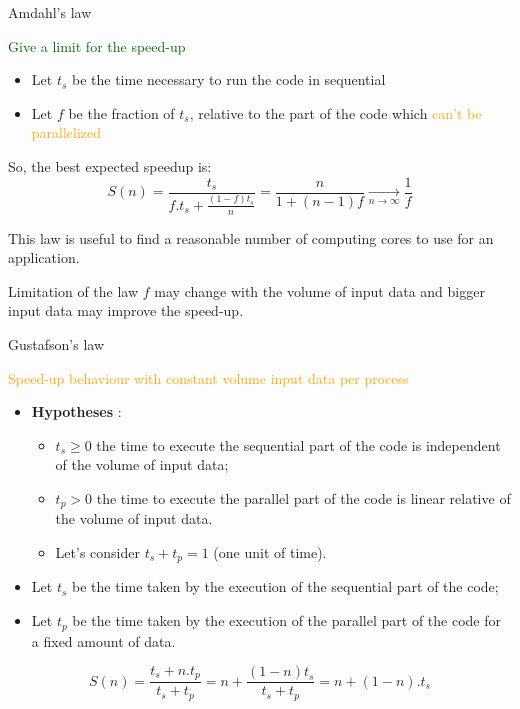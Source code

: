 \documentclass[compress,10pt,aspectratio=169]{beamer}
\begin{document}
\begin{frame}[fragile]{Amdahl's law}
\scriptsize
\begin{center}\textcolor{DarkGreen}{\large Give a limit for the speed-up}\end{center}

\begin{itemize}
\item Let $t_{s}$ be the time necessary to run the code in sequential
\item Let $f$ be the fraction of $t_{s}$, relative to the part of the code which \textcolor{orange}{can't be parallelized}
\end{itemize}

So, the best expected speedup is:
\[
    S(n) = \frac{t_{s}}{f.t_{s}+\frac{(1-f)t_{s}}{n}} = \frac{n}{1+(n-1)f} \xrightarrow[n \to \infty]{} \frac{1}{f}
\]

This law is useful to find a reasonable number of computing cores to use for an application.

\begin{alertblock}{Limitation of the law}
    $f$ may change with the volume of input data and bigger input data may improve the speed-up.
\end{alertblock}
\end{frame}

\begin{frame}[fragile]{Gustafson's law}
\scriptsize
\begin{center}{\large \textcolor{orange}{Speed-up behaviour with constant volume input data per process}}\end{center}

\begin{itemize}
\item \textbf{Hypotheses} : 
\begin{itemize}
    \item {\scriptsize $t_{s}\geq 0$ the time to execute the sequential part of the code is independent of the volume of input data;}
    \item {\scriptsize $t_{p} > 0$ the time to execute the parallel part of the code is linear relative of the volume of input data.}
    \item {\scriptsize Let's consider $t_{s}+t_{p} = 1$ (one unit of time)}.
\end{itemize}
\item Let $t_{s}$ be the time taken by the execution of the sequential part of the code;
\item Let $t_{p}$ be the time taken by the execution of the parallel part of the code for a fixed amount of data.
\end{itemize}

\[
    S(n) = \frac{t_{s}+n.t_{p}}{t_{s}+t_{p}} = n + \frac{(1-n)t_{s}}{t_{s}+t_{p}}
                                             = n + (1-n).t_{s}
\]
\end{frame}
\end{document}
